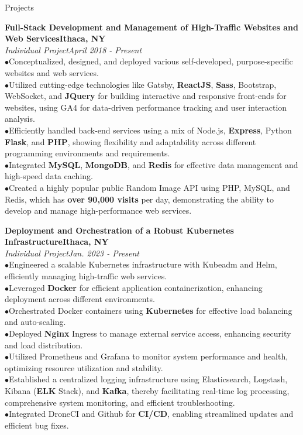 \documentclass{resume} %
\begin{document}
\begin{rSection}{Projects}

{\bf Full-Stack Development and Management of High-Traffic Websites and Web Services}\hfill{\textbf{Ithaca, NY}}
\\{\em Individual Project}\hfill {\em April 2018 - Present}
\\ $ \bullet $Conceptualized, designed, and deployed various self-developed, purpose-specific websites and web services.
\\ $ \bullet $Utilized cutting-edge technologies like Gatsby, \textbf{ReactJS}, \textbf{Sass}, Bootstrap, WebSocket, and \textbf{JQuery} for building interactive and responsive front-ends for websites, using GA4 for data-driven performance tracking and user interaction analysis.
\\ $ \bullet $Efficiently handled back-end services using a mix of Node.js, \textbf{Express}, Python \textbf{Flask}, and \textbf{PHP}, showing flexibility and adaptability across different programming environments and requirements.
\\ $ \bullet $Integrated \textbf{MySQL}, \textbf{MongoDB}, and \textbf{Redis} for effective data management and high-speed data caching.
\\ $ \bullet $Created a highly popular public Random Image API using PHP, MySQL, and Redis, which has \textbf{over 90,000 visits} per day, demonstrating the ability to develop and manage high-performance web services.

{\bf Deployment and Orchestration of a Robust Kubernetes Infrastructure}\hfill{\textbf{Ithaca, NY}}
\\{\em Individual Project}\hfill {\em Jan. 2023 - Present}
\\ $ \bullet $Engineered a scalable Kubernetes infrastructure with Kubeadm and Helm, efficiently managing high-traffic web services.
\\ $ \bullet $Leveraged \textbf{Docker} for efficient application containerization, enhancing deployment across different environments.
\\ $ \bullet $Orchestrated Docker containers using \textbf{Kubernetes} for effective load balancing and auto-scaling.
\\ $ \bullet $Deployed \textbf{Nginx} Ingress to manage external service access, enhancing security and load distribution.
\\ $ \bullet $Utilized Prometheus and Grafana to monitor system performance and health, optimizing resource utilization and stability.
\\ $ \bullet $Established a centralized logging infrastructure using Elasticsearch, Logstash, Kibana (\textbf{ELK} Stack), and \textbf{Kafka}, thereby facilitating real-time log processing, comprehensive system monitoring, and efficient troubleshooting.
\\ $ \bullet $Integrated DroneCI and Github for \textbf{CI/CD}, enabling streamlined updates and efficient bug fixes.



\end{rSection}
\end{document}
